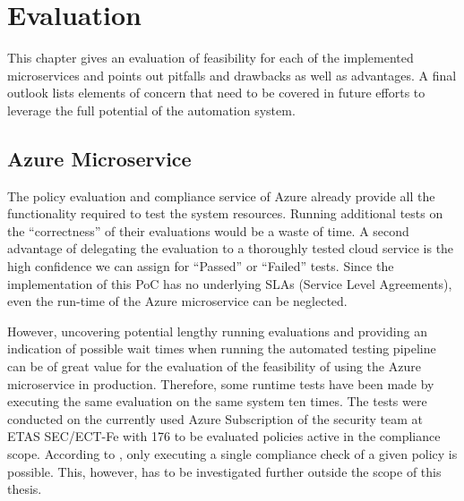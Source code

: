 \addchapheadtotoc
\chapter{Evaluation}
\label{evaluation}

This chapter gives an evaluation of feasibility for each of the implemented microservices and points out pitfalls and drawbacks as well as advantages. A final outlook lists elements of concern that need to be covered in future efforts to leverage the full potential of the automation system.

\section{Azure Microservice}
The policy evaluation and compliance service of Azure already provide all the functionality required to test the system resources. Running additional tests on the \enquote{correctness} of their evaluations would be a waste of time. A second advantage of delegating the evaluation to a thoroughly tested cloud service is the high confidence we can assign for \enquote{Passed} or \enquote{Failed} tests. 
Since the implementation of this PoC has no underlying SLAs (Service Level Agreements), even the run-time of the Azure microservice can be neglected.

However, uncovering potential lengthy running evaluations and providing an indication of possible wait times when running the automated testing pipeline can be of great value for the evaluation of the feasibility of using the Azure microservice in production. Therefore, some runtime tests have been made by executing the same evaluation on the same system ten times. The tests were conducted on the currently used Azure Subscription of the security team at ETAS SEC/ECT-Fe with 176 to be evaluated policies active in the compliance scope. According to \citep{stackoverflowTrigger}, only executing a single compliance check of a given policy is possible. This, however, has to be investigated further outside the scope of this thesis. 


